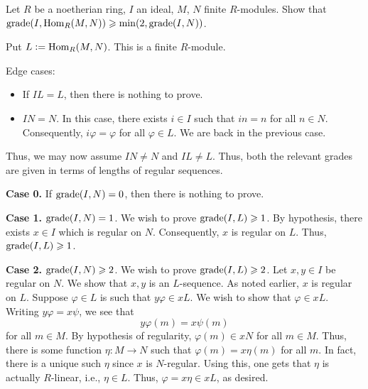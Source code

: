 \documentclass[12pt]{article}
\begin{document}
\begin{exe} \label{exe:grade-Hom-min-2-grade}
	Let $R$ be a noetherian ring, $I$ an ideal, $M$, $N$ finite $R$-modules. Show that $\operatorname{grade}(I, \operatorname{Hom}_{R}(M, N)) \geqslant \min(2, \operatorname{grade}(I, N))$.
\end{exe}
\begin{soln}
	Put $L \vcentcolon= \operatorname{Hom}_{R}(M, N)$. This is a finite $R$-module.

	Edge cases: 
	\begin{itemize}
		\item If $IL = L$, then there is nothing to prove.
		\item $IN = N$. In this case, there exists $i \in I$ such that $in = n$ for all $n \in N$. \newline
		Consequently, $i \varphi = \varphi$ for all $\varphi \in L$. We are back in the previous case.
	\end{itemize}

	Thus, we may now assume $IN \neq N$ and $IL \neq L$. Thus, both the relevant grades are given in terms of lengths of regular sequences.

	\textbf{Case 0.} If $\operatorname{grade}(I, N) = 0$, then there is nothing to prove.

	\textbf{Case 1.} $\operatorname{grade}(I, N) = 1$. We wish to prove $\operatorname{grade}(I, L) \geqslant 1$. \newline
	By hypothesis, there exists $x \in I$ which is regular on $N$. Consequently, $x$ is regular on $L$. Thus, $\operatorname{grade}(I, L) \geqslant 1$.

	\textbf{Case 2.} $\operatorname{grade}(I, N) \geqslant 2$. We wish to prove $\operatorname{grade}(I, L) \geqslant 2$. \newline
	Let $x, y \in I$ be regular on $N$. We show that $x, y$ is an $L$-sequence. As noted earlier, $x$ is regular on $L$. Suppose $\varphi \in L$ is such that $y \varphi \in x L$. We wish to show that $\varphi \in x L$. \newline
	Writing $y \varphi = x \psi$, we see that
	\begin{equation*} 
		y \varphi(m) = x \psi(m)
	\end{equation*}
	for all $m \in M$. By hypothesis of regularity, $\varphi(m) \in x N$ for all $m \in M$. \newline
	Thus, there is some function $\eta : M \to N$ such that $\varphi(m) = x \eta(m)$ for all $m$. \newline
	In fact, there is a unique such $\eta$ since $x$ is $N$-regular. Using this, one gets that $\eta$ is actually $R$-linear, i.e., $\eta \in L$. \newline
	Thus, $\varphi = x \eta \in x L$, as desired.
\end{soln}
\end{document}
